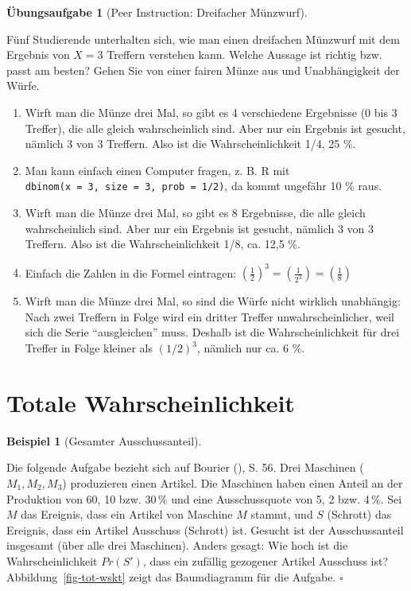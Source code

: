 \documentclass[
  ngerman,
  letterpaper,
  twoside,
  open=any]{scrbook}
\providecommand{\tightlist}{%
  \setlength{\itemsep}{0pt}\setlength{\parskip}{0pt}}\usepackage{longtable,booktabs,array}
\theoremstyle{definition}
\newtheorem{example}{Beispiel}[chapter]
\theoremstyle{plain}
\theoremstyle{definition}
\newtheorem{exercise}{Übungsaufgabe}[chapter]
\theoremstyle{definition}
\theoremstyle{definition}
\newtheorem{example}{Beispiel}[chapter]
\theoremstyle{definition}
\newtheorem{exercise}{Übungsaufgabe}[chapter]
\theoremstyle{remark}
\begin{document}
\begin{exercise}[Peer Instruction: Dreifacher
Münzwurf]\protect\hypertarget{exr-multsatz}{}\label{exr-multsatz}

Fünf Studierende unterhalten sich, wie man einen dreifachen Münzwurf mit
dem Ergebnis von \(X=3\) Treffern verstehen kann. Welche Aussage ist
richtig bzw. passt am besten? Gehen Sie von einer fairen Münze aus und
Unabhängigkeit der Würfe.

\begin{enumerate}
\def\labelenumi{\Alph{enumi})}
\tightlist
\item
  Wirft man die Münze drei Mal, so gibt es 4 verschiedene Ergebnisse (0
  bis 3 Treffer), die alle gleich wahrscheinlich sind. Aber nur ein
  Ergebnis ist gesucht, nämlich 3 von 3 Treffern. Also ist die
  Wahrscheinlichkeit 1/4, 25 \%.
\item
  Man kann einfach einen Computer fragen, z. B. R mit
  \texttt{dbinom(x\ =\ 3,\ size\ =\ 3,\ prob\ =\ 1/2)}, da kommt
  ungefähr 10 \% raus.
\item
  Wirft man die Münze drei Mal, so gibt es 8 Ergebnisse, die alle gleich
  wahrscheinlich sind. Aber nur ein Ergebnis ist gesucht, nämlich 3 von
  3 Treffern. Also ist die Wahrscheinlichkeit 1/8, ca. 12,5 \%.
\item
  Einfach die Zahlen in die Formel eintragen:
  \(\left(\frac{1}{2}\right)^3 = \left(\frac{1}{2^3}\right) = \left(\frac{1}{8}\right)\)
\item
  Wirft man die Münze drei Mal, so sind die Würfe nicht wirklich
  unabhängig: Nach zwei Treffern in Folge wird ein dritter Treffer
  unwahrscheinlicher, weil sich die Serie \enquote{ausgleichen} muss.
  Deshalb ist die Wahrscheinlichkeit für drei Treffer in Folge kleiner
  als \((1/2)^3\), nämlich nur ca. 6 \%.
\end{enumerate}

\end{exercise}

\section{Totale Wahrscheinlichkeit}\label{totale-wahrscheinlichkeit}

\begin{example}[Gesamter
Ausschussanteil]\protect\hypertarget{exm-bourier-s56}{}\label{exm-bourier-s56}

Die folgende Aufgabe bezieht sich auf Bourier
(), S. 56. Drei Maschinen
(\(M_1, M_2, M_3\)) produzieren einen Artikel. Die Maschinen haben einen
Anteil an der Produktion von 60, 10 bzw. 30\,\% und eine Ausschussquote
von 5, 2 bzw. 4\,\%. Sei \(M\) das Ereignis, dass ein Artikel von
Maschine \(M\) stammt, und \(S\) (Schrott) das Ereignis, dass ein
Artikel Ausschuss (Schrott) ist. Gesucht ist der Ausschussanteil
insgesamt (über alle drei Maschinen). Anders gesagt: Wie hoch ist die
Wahrscheinlichkeit \(Pr(S')\), dass ein zufällig gezogener Artikel
Ausschuss ist? Abbildung~\ref{fig-tot-wskt} zeigt das Baumdiagramm für
die Aufgabe. \(\square\)

\end{example}
\end{document}
